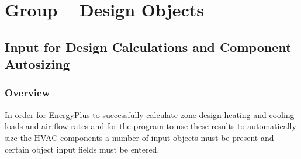 \section{Group -- Design Objects}\label{group-design-objects}

\subsection{Input for Design Calculations and Component Autosizing}\label{input-for-design-calculations-and-component-autosizing}

\subsubsection{Overview}\label{overview-000}

In order for EnergyPlus to successfully calculate zone design heating and cooling loads and air flow rates and for the program to use these results to automatically size the HVAC components a number of input objects must be present and certain object input fields must be entered.

